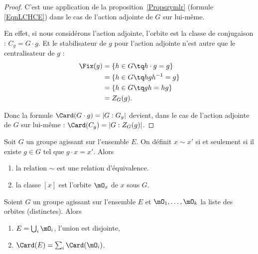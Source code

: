 \begin{proof}
	C'est une application de la proposition~\ref{Propszymlr} (formule \eqref{EqnLCHCE}) dans le cas de l'action adjointe de \( G\) sur lui-même.

	En effet, si nous considérons l'action adjointe, l'orbite est la classe de conjugaison : \( C_g=G\cdot g\). Et le stabilisateur de \( g\) pour l'action adjointe n'est autre que le centralisateur de \( g\) :
	\begin{subequations}
		\begin{align}
			\Fix(g) & =\{ h\in G\tq h\cdot g=g \} \\
			        & =\{ h\in G\tq hgh^{-1}=g \} \\
			        & =\{ h\in G\tq gh=hg \}      \\
			        & =Z_G(g).
		\end{align}
	\end{subequations}

	Donc la formule \( \Card(G\cdot g)=| G:G_g |\) devient, dans le cas de l'action adjointe de \( G\) sur lui-même : \( \Card(C_g)=| G:Z_G(g) |\).
\end{proof}

\begin{lemma}		\label{LEMooVGOJooSBpIag}
	Soit \( G\) un groupe agissant sur l'ensemble \( E\). On définit \( x\sim x'\) si et seulement si il existe \( g\in G\) tel que \( g\cdot x=x'\). Alors
	\begin{enumerate}
		\item
		      la relation \( \sim\) est une relation d'équivalence.
		\item
		      la classe \( [x]\) est l'orbite \( \mO_x\) de \( x\) sous \( G\).
	\end{enumerate}
\end{lemma}

\begin{corollary} \label{CorARFVMP}
	Soient \( G\) un groupe agissant sur l'ensemble \( E\) et \( \mO_1,\ldots, \mO_k  \) la liste des orbites (distinctes). Alors
	\begin{enumerate}
		\item
		      \( E=\bigcup_i\mO_i\), l'union est disjointe,
		\item
		      \( \Card(E)=\sum_i\Card(\mO_i)\).
	\end{enumerate}
\end{corollary}

